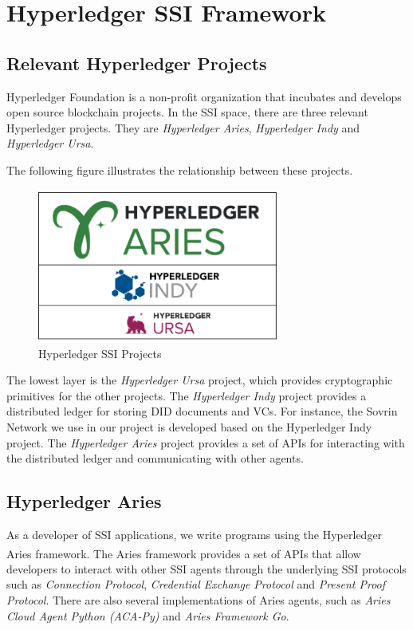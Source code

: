 \documentclass[
]{report}
\begin{document}
\section{Hyperledger SSI Framework}

\subsection{Relevant Hyperledger Projects}
Hyperledger Foundation is a non-profit organization that incubates and
develops open source blockchain projects. In the SSI space, there are three
relevant Hyperledger projects. They are \emph{Hyperledger Aries},
\emph{Hyperledger Indy} and \emph{Hyperledger Ursa}.

The following figure illustrates the relationship between these projects.

\begin{figure}
\centering
\includegraphics[width=8cm]{eco.png}
\caption{Hyperledger SSI Projects}
\end{figure}

The lowest layer is the \emph{Hyperledger Ursa} project, which provides
cryptographic primitives for the other projects. The \emph{Hyperledger
Indy} project provides a distributed ledger for storing DID documents and
VCs. For instance, the Sovrin Network we use in our project is developed
based on the Hyperledger Indy project. The \emph{Hyperledger Aries}
project provides a set of APIs for interacting with the distributed
ledger and communicating with other agents.

\subsection{Hyperledger Aries}
As a developer of SSI applications, we write programs using the Hyperledger
Aries framework\textsuperscript{\cite{EdxHyperledgerAries}}.
The Aries framework provides a set of APIs that allow
developers to interact with other SSI agents through the underlying SSI
protocols such as \emph{Connection Protocol}, \emph{Credential Exchange
Protocol} and \emph{Present Proof Protocol}. There are also several
implementations of Aries agents, such as \emph{Aries Cloud Agent
Python (ACA-Py)} and \emph{Aries Framework Go}.
\end{document}
